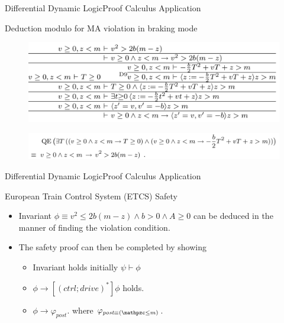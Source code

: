 \documentclass{beamer}
\begin{document}
\begin{frame}{Differential Dynamic Logic}{Proof Calculus Application}
  \begin{block}{Deduction modulo for MA violation in braking mode}
    \begin{figure}
      \includegraphics[scale=0.35]{ects-precondition-violation}
    \end{figure}
    \begin{figure}
      \includegraphics[scale=0.35]{ects-quantifier-elimination}
    \end{figure}
  \end{block}
\end{frame}

\begin{frame}{Differential Dynamic Logic}{Proof Calculus Application}
  \begin{block}{European Train Control System (ETCS) Safety}
    \begin{itemize}
      \item Invariant $\phi \equiv v^2 \leq 2b(m-z) \wedge b > 0 \wedge A \geq
        0$ can be deduced in the manner of finding the violation condition.
      \item The safety proof can then be completed by showing
        \begin{itemize}
          \item Invariant holds initially $\psi \vdash \phi$
          \item $ \phi \to [(ctrl;drive)^*] \phi$ holds.
          \item $\phi \to \varphi_{\textit{post}}$. where
            $\varphi_{\textit{post} \equiv (\mathpzc \leq m)}$.
        \end{itemize}
    \end{itemize}
  \end{block}
\end{frame}
\end{document}
